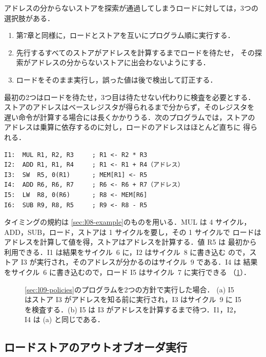 \documentclass[../main.tex]{subfiles}
\begin{document}
アドレスの分からないストアを探索が通過してしまうロードに対しては，3つの
選択肢がある．
\begin{enumerate}
  \item 第7章と同様に，ロードとストアを互いにプログラム順に実行する．
  \item 先行するすべてのストアがアドレスを計算するまでロードを待たせ，
    その探索がアドレスの分からないストアに出会わないようにする．
  \item ロードをそのまま実行し，誤った値は後で検出して訂正する．
\end{enumerate}
最初の2つはロードを待たせ，3つ目は待たせない代わりに検査を必要とする．
ストアのアドレスはベースレジスタが得られるまで分からず，そのレジスタを
遅い命令が計算する場合には長くかかりうる．次のプログラムでは，ストアの
アドレスは乗算に依存するのに対し，ロードのアドレスはほとんど直ちに
得られる．
\begin{lstlisting}[language={[x86masm]Assembler}, numbers=none]
I1:  MUL R1, R2, R3     ; R1 <- R2 * R3
I2:  ADD R1, R1, R4     ; R1 <- R1 + R4（アドレス）
I3:  SW  R5, 0(R1)      ; MEM[R1] <- R5
I4:  ADD R6, R6, R7     ; R6 <- R6 + R7（アドレス）
I5:  LW  R8, 0(R6)      ; R8 <- MEM[R6]
I6:  SUB R9, R8, R5     ; R9 <- R8 - R5
\end{lstlisting}
タイミングの規約は \cref{sec:l08-example}のものを用いる．MUL は 4
サイクル，ADD，SUB，ロード，ストアは 1 サイクルを要し，その 1 サイクルで
ロードはアドレスを計算して値を得，ストアはアドレスを計算する．値 R5 は
最初から利用できる．I1 は結果をサイクル~6 に，I2 はサイクル~8 に書き込む
ので，ストア I3 が実行され，そのアドレスが分かるのはサイクル~9 である．I4 は
結果をサイクル~6 に書き込むので，ロード I5 はサイクル~7 に実行できる
（\cref{fig:l09-policies}）．

\begin{figure}[htbp]
  \centering
  
  \caption{\cref{sec:l09-policies}のプログラムを2つの方針で実行した場合．
    (a) I5 はストア I3 がアドレスを知る前に実行され，I3 はサイクル~9 に
    I5 を検査する．(b) I5 は I3 がアドレスを計算するまで待つ．I1，I2，I4
    は (a) と同じである．}
  \label{fig:l09-policies}
\end{figure}

\subsection{ロードストアのアウトオブオーダ実行}
\end{document}
